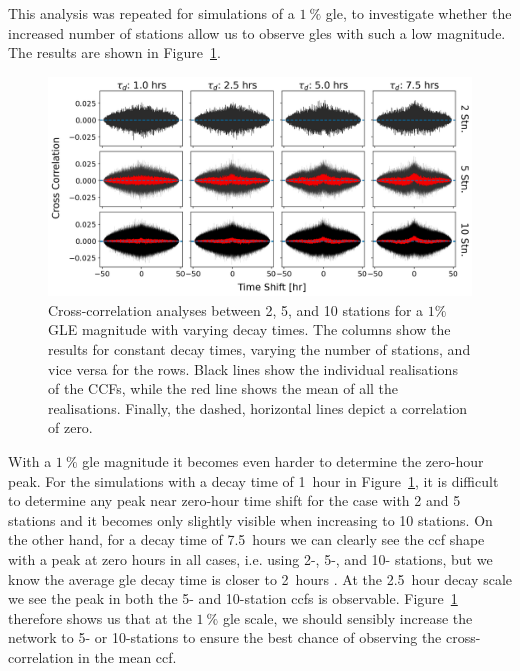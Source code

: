 This analysis was repeated for simulations of a $1~\%$ \gls{gle}, to investigate whether the increased number of stations allow us to observe \glspl{gle} with such a low magnitude. The results are shown in Figure~\ref{fig:HS_14008_1pc_sim_CCFs}.


\begin{figure}[ht!]
	\centering
	\includegraphics[width=\columnwidth]{HS_14008_sims_CCF_1pc_plot.png}
	\caption{Cross-correlation analyses between 2, 5, and 10 stations for a $1 \%$ GLE magnitude with varying decay times. The columns show the results for constant decay times, varying the number of stations, and vice versa for the rows. Black lines show the individual realisations of the CCFs, while the red line shows the mean of all the realisations. Finally, the dashed, horizontal lines depict a correlation of zero.}
	\label{fig:HS_14008_1pc_sim_CCFs}
\end{figure}


With a $1~\%$ \gls{gle} magnitude it becomes even harder to determine the zero-hour peak. For the simulations with a decay time of 1~hour in Figure~\ref{fig:HS_14008_1pc_sim_CCFs}, it is difficult to determine any peak near zero-hour time shift for the case with 2 and 5 stations and it becomes only slightly visible when increasing to 10 stations. On the other hand, for a decay time of 7.5~hours we can clearly see the \gls{ccf} shape with a peak at zero hours in all cases, i.e. using 2-, 5-, and 10- stations, but we know the average \gls{gle} decay time is closer to 2~hours \citep{strauss_pulse_2017}. At the 2.5~hour decay scale we see the peak in both the 5- and 10-station \glspl{ccf} is observable. Figure~\ref{fig:HS_14008_1pc_sim_CCFs} therefore shows us that at the $1~\%$ \gls{gle} scale, we should sensibly increase the network to 5- or 10-stations to ensure the best chance of observing the cross-correlation in the mean \gls{ccf}.

